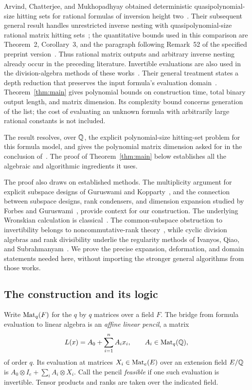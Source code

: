 Arvind, Chatterjee, and Mukhopadhyay obtained deterministic
quasipolynomial-size hitting sets for rational formulas of inversion
height two~\citep[Theorem~1.1]{ACM22}.
Their subsequent general result handles unrestricted inverse
nesting with quasipolynomial-size rational matrix hitting
sets~\citep{ACM26}; the quantitative bounds used in this comparison
are Theorem~2, Corollary~3, and the paragraph following Remark~52
of the specified preprint version~\citep{ACM25}. Thus rational matrix outputs and arbitrary
inverse nesting already occur in the preceding literature.
Invertible evaluations are also used in the division-algebra methods
of these works~\citep{ACM22,ACM25}. Their general treatment states a
depth reduction that preserves the input formula's evaluation
domain~\citep[Fact~1]{ACM25}. Theorem~\ref{thm:main} gives polynomial
bounds on construction time, total binary output length, and matrix
dimension.
Its complexity bound concerns generation of the list; the cost of
evaluating an unknown formula with arbitrarily large rational
constants is not included.

The result resolves, over $\mathbb Q$, the explicit polynomial-size hitting-set
problem for this formula model, and gives the polynomial matrix
dimension asked for in the conclusion of~\citet{ACM25}.
The proof of Theorem~\ref{thm:main} below establishes all the algebraic and algorithmic
ingredients it uses.

The proof also draws on established methods. The multiplicity
argument for explicit subspace designs of Guruswami and
Kopparty~\citep{GK16}, and the connection between subspace designs,
rank condensers, and dimension expansion studied by Forbes and
Guruswami~\citep{FG15}, provide context for our
construction. The underlying Wronskian calculation is
classical~\citep{BD10}. The common-subspace obstruction to
invertibility belongs to noncommutative-rank
theory~\citep{FR04}, while cyclic division algebras and rank
divisibility underlie the regularity methods of Ivanyos, Qiao,
and Subrahmanyam~\citep{IQS17,IQS18}. We prove the precise expansion,
deformation, and domain statements needed here, without importing
the stronger general algorithms from those works.

\subsection{The construction and its logic}

Write $\operatorname{Mat}_q(F)$ for the $q$ by $q$ matrices over a field $F$.
The bridge from formula evaluation to linear algebra is an
\emph{affine linear pencil}, a matrix
\[
 L(x)=A_0+\sum_{i=1}^n A_ix_i,\qquad A_i\in\operatorname{Mat}_q(\mathbb Q),
\]
of order $q$. Its evaluation at matrices $X_i\in\operatorname{Mat}_e(E)$ over an
extension field $E/\mathbb Q$ is $A_0\otimes I_e+\sum_iA_i\otimes X_i$.
Call the pencil \emph{feasible} if one such evaluation is invertible.
Tensor products and ranks are taken over the indicated field.

